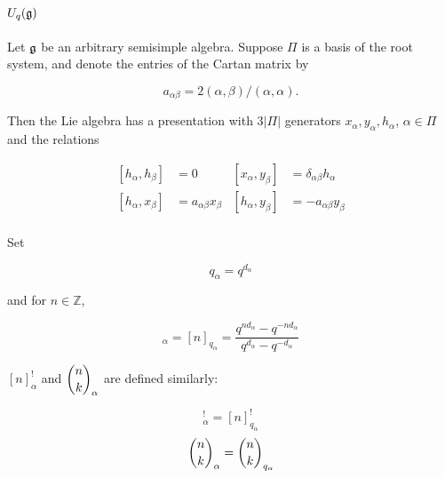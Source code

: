 \section{$U_q(\mathfrak{g})$}
\label{U_q(g)}


    Let $\mathfrak{g}$ be an arbitrary semisimple algebra. Suppose $\Pi$ is
    a basis of the root system, and denote the entries of the Cartan matrix
    by 

    \begin{equation}
        a_{\alpha\beta} = 2(\alpha, \beta) / (\alpha, \alpha).
    \end{equation}

    Then the Lie algebra has a presentation with $3|\Pi|$ generators
    $x_\alpha, y_\alpha, h_\alpha$, $\alpha \in \Pi$ and the relations 

    \begin{align}
        \left[ h_\alpha, h_\beta \right] &= 0       &   \left[ x_\alpha, y_\beta \right] &= \delta_{\alpha\beta} h_\alpha \\
        \left[ h_\alpha, x_\beta \right] &= a_{\alpha\beta} x_\beta  &   \left[ h_\alpha, y_\beta \right] &= -a_{\alpha\beta} y_\beta \\
    \end{align}

    Set

    \begin{equation}
        q_\alpha = q^{d_\alpha}
    \end{equation}

    and for $n \in \mathbb{Z}$,

    \begin{equation}
        [n]_\alpha = [n]_{q_\alpha} = \frac{q^{nd_\alpha} - q^{-nd_\alpha}}{q^{d_\alpha} - q^{-d_\alpha}}
    \end{equation}

    $[n]_\alpha^!$ and $\dbinom{n}{k}_\alpha$ are defined similarly: 
    
    \begin{equation}
        [n]_\alpha^! = [n]_{q_{\alpha}}^!
    \end{equation}
    \begin{equation}
        \dbinom{n}{k}_\alpha = \dbinom{n}{k}_{q_\alpha}
    \end{equation}

